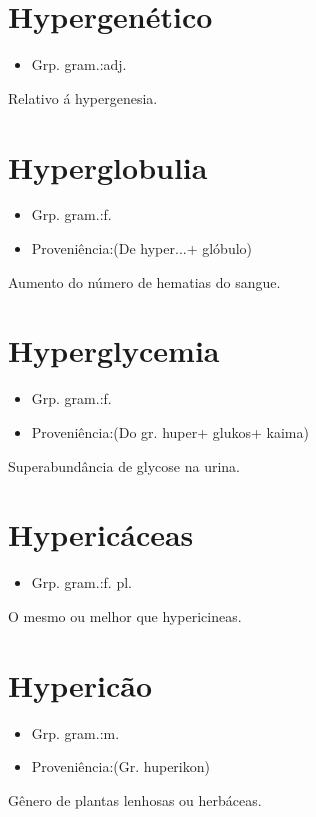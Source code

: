 \documentclass{article}
\begin{document}
\section{Hypergenético}
\begin{itemize}
\item {Grp. gram.:adj.}
\end{itemize}
Relativo á hypergenesia.
\section{Hyperglobulia}
\begin{itemize}
\item {Grp. gram.:f.}
\end{itemize}
\begin{itemize}
\item {Proveniência:(De \textunderscore hyper...\textunderscore  + \textunderscore glóbulo\textunderscore )}
\end{itemize}
Aumento do número de hematias do sangue.
\section{Hyperglycemia}
\begin{itemize}
\item {Grp. gram.:f.}
\end{itemize}
\begin{itemize}
\item {Proveniência:(Do gr. \textunderscore huper\textunderscore  + \textunderscore glukos\textunderscore  + \textunderscore kaima\textunderscore )}
\end{itemize}
Superabundância de glycose na urina.
\section{Hypericáceas}
\begin{itemize}
\item {Grp. gram.:f. pl.}
\end{itemize}
O mesmo ou melhor que \textunderscore hypericineas\textunderscore .
\section{Hypericão}
\begin{itemize}
\item {Grp. gram.:m.}
\end{itemize}
\begin{itemize}
\item {Proveniência:(Gr. \textunderscore huperikon\textunderscore )}
\end{itemize}
Gênero de plantas lenhosas ou herbáceas.
\end{document}
